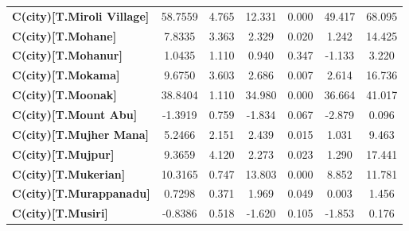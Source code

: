 \begin{center}
\begin{tabular}{lcccccc}
\textbf{C(city)[T.Miroli Village]}                                                                  &      58.7559  &        4.765     &    12.331  &         0.000        &       49.417    &       68.095     \\
\textbf{C(city)[T.Mohane]}                                                                          &       7.8335  &        3.363     &     2.329  &         0.020        &        1.242    &       14.425     \\
\textbf{C(city)[T.Mohanur]}                                                                         &       1.0435  &        1.110     &     0.940  &         0.347        &       -1.133    &        3.220     \\
\textbf{C(city)[T.Mokama]}                                                                          &       9.6750  &        3.603     &     2.686  &         0.007        &        2.614    &       16.736     \\
\textbf{C(city)[T.Moonak]}                                                                          &      38.8404  &        1.110     &    34.980  &         0.000        &       36.664    &       41.017     \\
\textbf{C(city)[T.Mount Abu]}                                                                       &      -1.3919  &        0.759     &    -1.834  &         0.067        &       -2.879    &        0.096     \\
\textbf{C(city)[T.Mujher Mana]}                                                                     &       5.2466  &        2.151     &     2.439  &         0.015        &        1.031    &        9.463     \\
\textbf{C(city)[T.Mujpur]}                                                                          &       9.3659  &        4.120     &     2.273  &         0.023        &        1.290    &       17.441     \\
\textbf{C(city)[T.Mukerian]}                                                                        &      10.3165  &        0.747     &    13.803  &         0.000        &        8.852    &       11.781     \\
\textbf{C(city)[T.Murappanadu]}                                                                     &       0.7298  &        0.371     &     1.969  &         0.049        &        0.003    &        1.456     \\
\textbf{C(city)[T.Musiri]}                                                                          &      -0.8386  &        0.518     &    -1.620  &         0.105        &       -1.853    &        0.176     \\

\end{tabular}
\end{center}
